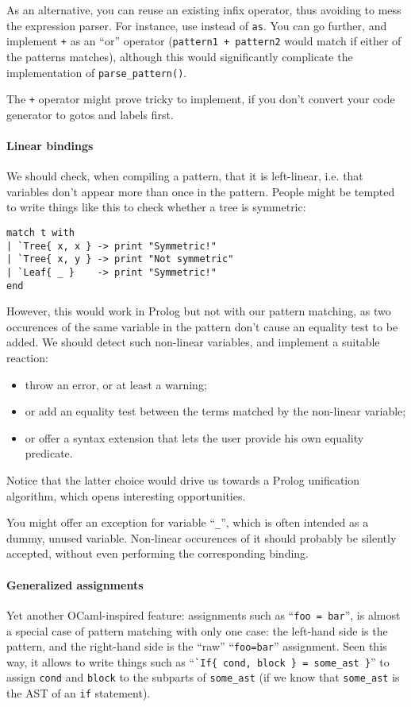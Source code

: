 As an alternative, you can reuse an existing infix operator, thus
avoiding to mess the expression parser. For instance, use {\tt *}
instead of {\tt as}. You can go further, and implement {\tt +} as an
``or'' operator ({\tt pattern1 + pattern2} would match if either
of the patterns matches), although this would significantly complicate
the implementation of {\tt parse\_pattern()}. 

The {\tt+} operator might prove tricky to implement, if you don't
convert your code generator to gotos and labels first.

\paragraph{Linear bindings}
We should check, when compiling a pattern, that it is left-linear,
i.e. that variables don't appear more than once in the pattern. People
might be tempted to write things like this to check whether a tree is
symmetric:
\begin{verbatim}
match t with
| `Tree{ x, x } -> print "Symmetric!"
| `Tree{ x, y } -> print "Not symmetric"
| `Leaf{ _ }    -> print "Symmetric!"
end
\end{verbatim}
However, this would work in Prolog but not with our pattern matching,
as two occurences of the same variable in the pattern don't cause an
equality test to be added. We should detect such non-linear variables,
and implement a suitable reaction:
\begin{itemize}
\item throw an error, or at least a warning;
\item or add an equality test between the terms matched by the
  non-linear variable;
\item or offer a syntax extension that lets the user provide his own
  equality predicate.
\end{itemize}

Notice that the latter choice would drive us towards a Prolog
unification algorithm, which opens interesting opportunities.

You might offer an exception for variable ``{\tt\_}'', which is often
intended as a dummy, unused variable. Non-linear occurences of it
should probably be silently accepted, without even performing the
corresponding binding. 

\paragraph{Generalized assignments}
Yet another OCaml-inspired feature: assignments such as
``\verb|foo = bar|'', is almost a special
case of pattern matching with only one case: the left-hand side is
the pattern, and the right-hand side is the ``raw'' ``\verb|foo=bar|''
assignment. Seen this way, it allows to write things such as
``\verb|`If{ cond, block } = some_ast }|'' to assign \verb|cond| and
\verb|block| to the subparts of \verb|some_ast| (if we know that
\verb|some_ast| is the AST of an \verb|if| statement). 

